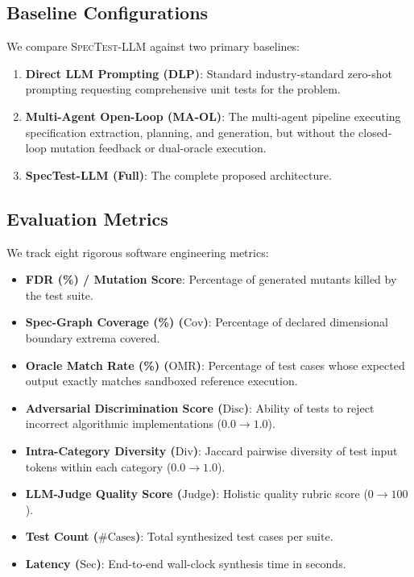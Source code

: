 \documentclass[conference]{IEEEtran}
\begin{document}
\subsection{Baseline Configurations}
We compare \textsc{SpecTest-LLM} against two primary baselines:
\begin{enumerate}
    \item \textbf{Direct LLM Prompting (DLP)}: Standard industry-standard zero-shot prompting requesting comprehensive unit tests for the problem.
    \item \textbf{Multi-Agent Open-Loop (MA-OL)}: The multi-agent pipeline executing specification extraction, planning, and generation, but without the closed-loop mutation feedback or dual-oracle execution.
    \item \textbf{SpecTest-LLM (Full)}: The complete proposed architecture.
\end{enumerate}

\subsection{Evaluation Metrics}
We track eight rigorous software engineering metrics:
\begin{itemize}
    \item \textbf{FDR (\%) / Mutation Score}: Percentage of generated mutants killed by the test suite.
    \item \textbf{Spec-Graph Coverage (\%) ($\text{Cov}$)}: Percentage of declared dimensional boundary extrema covered.
    \item \textbf{Oracle Match Rate (\%) ($\text{OMR}$)}: Percentage of test cases whose expected output exactly matches sandboxed reference execution.
    \item \textbf{Adversarial Discrimination Score ($\text{Disc}$)}: Ability of tests to reject incorrect algorithmic implementations ($0.0 \to 1.0$).
    \item \textbf{Intra-Category Diversity ($\text{Div}$)}: Jaccard pairwise diversity of test input tokens within each category ($0.0 \to 1.0$).
    \item \textbf{LLM-Judge Quality Score ($\text{Judge}$)}: Holistic quality rubric score ($0 \to 100$).
    \item \textbf{Test Count ($\#\text{Cases}$)}: Total synthesized test cases per suite.
    \item \textbf{Latency ($\text{Sec}$)}: End-to-end wall-clock synthesis time in seconds.
\end{itemize}
\end{document}
